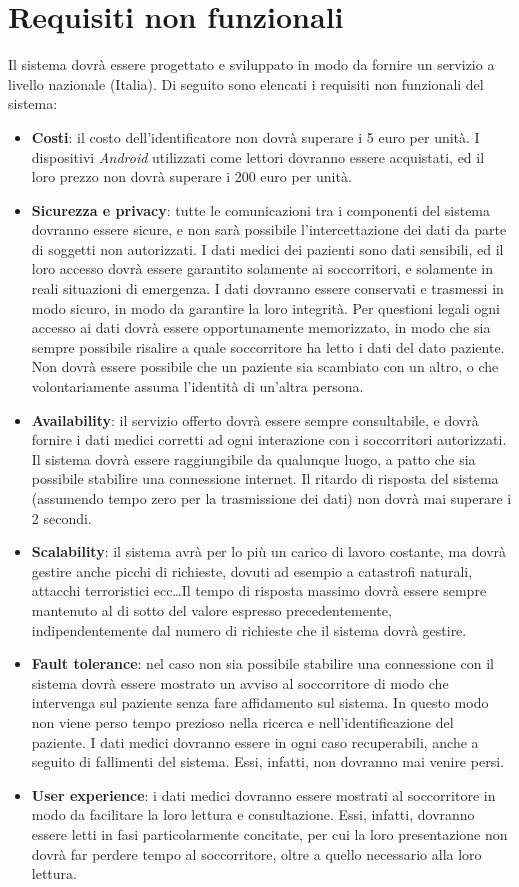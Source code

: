 \documentclass[a4paper,12pt]{report}
\begin{document}
\section{Requisiti non funzionali}
Il sistema dovrà essere progettato e sviluppato in modo da fornire un servizio a livello nazionale (Italia). 
Di seguito sono elencati i requisiti non funzionali del sistema:
\begin{itemize}
	\item \textbf{Costi}: il costo dell'identificatore non dovrà superare i 5 euro per unità. I dispositivi \emph{Android} utilizzati come lettori dovranno essere acquistati, ed il loro prezzo non dovrà superare i 200 euro per unità.
	\item \textbf{Sicurezza e privacy}: tutte le comunicazioni tra i componenti del sistema dovranno essere sicure, e non sarà possibile l'intercettazione dei dati da parte di soggetti non autorizzati. I dati medici dei pazienti sono dati sensibili, ed il loro accesso dovrà essere garantito solamente ai soccorritori, e solamente in reali situazioni di emergenza. I dati dovranno essere conservati e trasmessi in modo sicuro, in modo da garantire la loro integrità. Per questioni legali ogni accesso ai dati dovrà essere opportunamente memorizzato, in modo che sia sempre possibile risalire a quale soccorritore ha letto i dati del dato paziente. Non dovrà essere possibile che un paziente sia scambiato con un altro, o che volontariamente assuma l'identità di un'altra persona.
	\item \textbf{Availability}: il servizio offerto dovrà essere sempre consultabile, e dovrà fornire i dati medici corretti ad ogni interazione con i soccorritori autorizzati. Il sistema dovrà essere raggiungibile da qualunque luogo, a patto che sia possibile stabilire una connessione internet. Il ritardo di risposta del sistema (assumendo tempo zero per la trasmissione dei dati) non dovrà mai superare i 2 secondi.
	\item \textbf{Scalability}: il sistema avrà per lo più un carico di lavoro costante, ma dovrà gestire anche picchi di richieste, dovuti ad esempio a catastrofi naturali, attacchi terroristici ecc\dots  Il tempo di risposta massimo dovrà essere sempre mantenuto al di sotto del valore espresso precedentemente, indipendentemente dal numero di richieste che il sistema dovrà gestire. 
	\item \textbf{Fault tolerance}: nel caso non sia possibile stabilire una connessione con il sistema dovrà essere mostrato un avviso al soccorritore di modo che intervenga sul paziente senza fare affidamento sul sistema. In questo modo non viene perso tempo prezioso nella ricerca e nell'identificazione del paziente. I dati medici dovranno essere in ogni caso recuperabili, anche a seguito di fallimenti del sistema. Essi, infatti, non dovranno mai venire persi. 
	\item \textbf{User experience}: i dati medici dovranno essere mostrati al soccorritore in modo da facilitare la loro lettura e consultazione. Essi, infatti, dovranno essere letti in fasi particolarmente concitate, per cui la loro presentazione non dovrà far perdere tempo al soccorritore, oltre a quello necessario alla loro lettura. 
\end{itemize}
\end{document}
